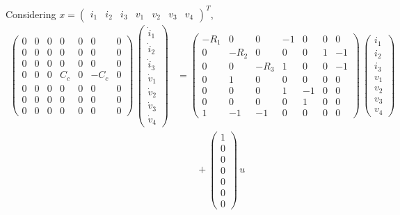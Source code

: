 Considering $x = \begin{pmatrix} i_1 & i_2 & i_3 & v_1 & v_2 & v_3 & v_4 \end{pmatrix}^T$,
\begin{align*}
    \begin{pmatrix}
            0   & 0     & 0     & 0     & 0     & 0     & 0 \\
            0   & 0     & 0     & 0     & 0     & 0     & 0 \\
            0   & 0     & 0     & 0     & 0     & 0     & 0  \\
            0   & 0     & 0     & C_c   & 0     & -C_c  & 0 \\
            0   & 0     & 0     & 0     & 0     & 0     & 0  \\
            0   & 0     & 0     & 0     & 0     & 0     & 0  \\
            0   & 0     & 0     & 0     & 0     & 0     & 0 
        \end{pmatrix}\,\begin{pmatrix} 
            \dot i_1 \\ \dot i_2 \\ \dot i_3 \\ \dot v_1 \\ \dot v_2 \\ \dot v_3 \\ \dot v_4
        \end{pmatrix} &= \begin{pmatrix}
        -R_1& 0     & 0     & -1    & 0     & 0     & 0 \\
        0   & -R_2  & 0     & 0     & 0     & 1     & -1 \\
        0   & 0     & -R_3  & 1     & 0     & 0     & -1 \\
        0   & 1     & 0     & 0     & 0     & 0     & 0 \\
        0   & 0     & 0     & 1     & -1    & 0     & 0\\
        0   & 0     & 0     & 0     & 1     & 0     & 0\\
        1   & -1    & -1    & 0     & 0     & 0     & 0
    \end{pmatrix}\,\begin{pmatrix} 
        i_1 \\ i_2 \\ i_3 \\ v_1 \\ v_2 \\ v_3 \\ v_4 
    \end{pmatrix} \\ 
    & \qquad + \begin{pmatrix} 1 \\ 0 \\ 0 \\ 0 \\ 0 \\ 0 \\ 0 \end{pmatrix}\,u
\end{align*}

